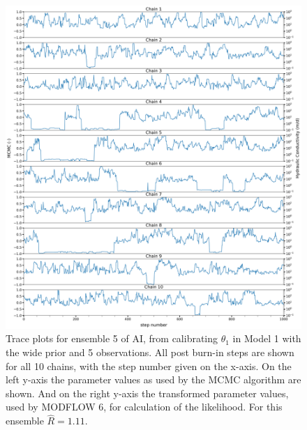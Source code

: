 \begin{figure}[ht]
\centering
\includegraphics[width=1.0\textwidth]{Figures/appendix_figs/trace_plots_ensemble5_Stretch priorbroad.png}
\caption{Trace plots for ensemble 5 of AI, from calibrating  $\theta_1$ in Model 1 with the wide prior and 5 observations. All post burn-in steps are shown for all 10 chains, with the step number given on the x-axis. On the left y-axis the parameter values as used by the MCMC algorithm are shown. And on the right y-axis the transformed parameter values, used by MODFLOW 6, for calculation of the likelihood.  For this ensemble $\hat{R}=1.11$.}\label{traceplot_AI_priorbroad}
\end{figure}

